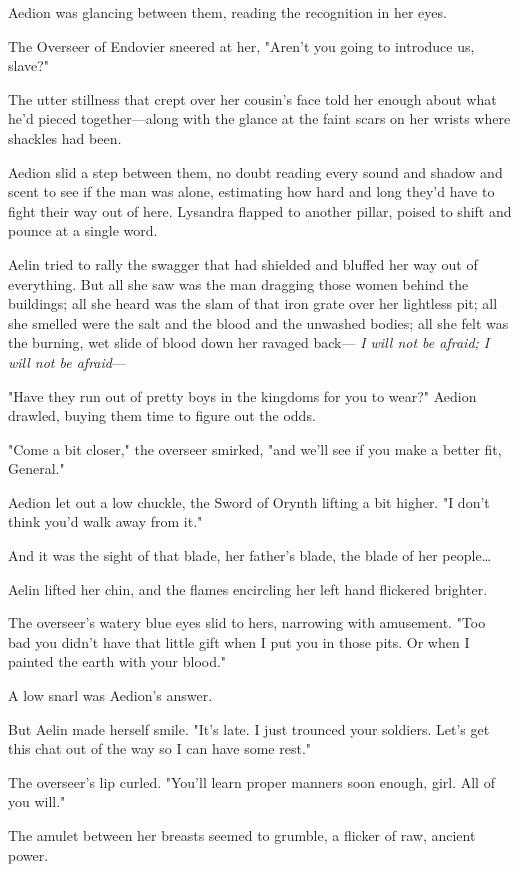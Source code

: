 Aedion was glancing between them, reading the recognition in her eyes.

The Overseer of Endovier sneered at her, "Aren't you going to introduce us, slave?"

The utter stillness that crept over her cousin's face told her enough about what he'd pieced together---along with the glance at the faint scars on her wrists where shackles had been.

Aedion slid a step between them, no doubt reading every sound and shadow and scent to see if the man was alone, estimating how hard and long they'd have to fight their way out of here.
Lysandra flapped to another pillar, poised to shift and pounce at a single word.

Aelin tried to rally the swagger that had shielded and bluffed her way out of everything.
But all she saw was the man dragging those women behind the buildings; all she heard was the slam of that iron grate over her lightless pit; all she smelled were the salt and the blood and the unwashed bodies; all she felt was the burning, wet slide of blood down her ravaged back--- \emph{I will not be afraid; I will not be afraid}---

"Have they run out of pretty boys in the kingdoms for you to wear?"
Aedion drawled, buying them time to figure out the odds.

"Come a bit closer," the overseer smirked, "and we'll see if you make a better fit, General."

Aedion let out a low chuckle, the Sword of Orynth lifting a bit higher.
"I don't think you'd walk away from it."

And it was the sight of that blade, her father's blade, the blade of her people\ldots{}

Aelin lifted her chin, and the flames encircling her left hand flickered brighter.

The overseer's watery blue eyes slid to hers, narrowing with amusement.
"Too bad you didn't have that little gift when I put you in those pits.
Or when I painted the earth with your blood."

A low snarl was Aedion's answer.

But Aelin made herself smile.
"It's late.
I just trounced your soldiers.
Let's get this chat out of the way so I can have some rest."

The overseer's lip curled.
"You'll learn proper manners soon enough, girl.
All of you will."

The amulet between her breasts seemed to grumble, a flicker of raw, ancient power.

